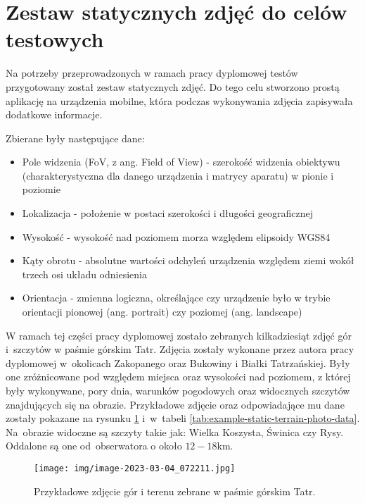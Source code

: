 \newpage

\section{Zestaw statycznych zdjęć do celów testowych} \label{sec:zebranie_zdjec}

Na potrzeby przeprowadzonych w ramach pracy dyplomowej testów przygotowany został zestaw statycznych zdjęć. Do tego celu stworzono prostą aplikację na urządzenia mobilne, która podczas wykonywania zdjęcia zapisywała dodatkowe informacje.

Zbierane były następujące dane:

\begin{itemize}
    \item Pole widzenia (FoV, z ang. Field of View) - szerokość widzenia obiektywu (charakterystyczna dla danego urządzenia i matrycy aparatu) w pionie i poziomie
    \item Lokalizacja - położenie w postaci szerokości i długości geograficznej
    \item Wysokość  - wysokość nad poziomem morza względem elipsoidy WGS84 \cite{wgs84}
    \item Kąty obrotu - absolutne wartości odchyleń urządzenia względem ziemi wokół trzech osi układu odniesienia
    \item Orientacja - zmienna logiczna, określające czy urządzenie było w trybie orientacji pionowej (ang. portrait) czy poziomej (ang. landscape)
\end{itemize}


W ramach tej części pracy dyplomowej zostało zebranych kilkadziesiąt zdjęć gór i~szczytów w paśmie górskim Tatr. Zdjęcia zostały wykonane przez autora pracy dyplomowej w~okolicach Zakopanego oraz Bukowiny i Białki Tatrzańskiej. Były one zróżnicowane pod względem miejsca oraz wysokości nad poziomem, z której były wykonywane, pory dnia, warunków pogodowych oraz widocznych szczytów znajdujących się na obrazie. Przykładowe zdjęcie oraz odpowiadające mu dane zostały pokazane na rysunku \ref{fig:example-static-terrain-photo} i~w~tabeli \ref{tab:example-static-terrain-photo-data}. Na~obrazie widoczne są szczyty takie jak: Wielka Koszysta, Świnica czy Rysy. Oddalone są one od~obserwatora o około $12-18$km. 

\begin{figure}[!h]
    \centering \texttt{[image: img/image-2023-03-04\_072211.jpg]}
    \caption{Przykładowe zdjęcie gór i terenu zebrane w paśmie górskim Tatr.}
    \label{fig:example-static-terrain-photo}
\end{figure}

